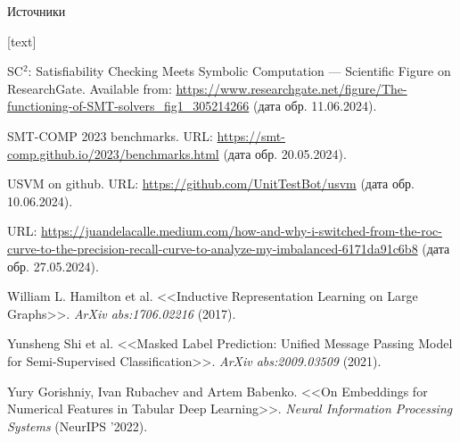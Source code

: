 \documentclass[14pt,aspectratio=169,hyperref={pdftex,unicode},xcolor=dvipsnames]{beamer}
\begin{document}
\begin{frame}{Источники}

\begin{thebibliography}{1}

[text]

 SC$^{\text{2}}$: Satisfiability Checking Meets Symbolic Computation --- Scientific Figure on ResearchGate. Available from: \url{https://www.researchgate.net/figure/The-functioning-of-SMT-solvers_fig1_305214266} (дата обр. 11.06.2024).

 SMT-COMP 2023 benchmarks. URL: \url{https://smt-comp.github.io/2023/benchmarks.html} (дата обр. 20.05.2024).

 USVM on github. URL: \url{https://github.com/UnitTestBot/usvm} (дата обр. 10.06.2024).

 URL: \url{https://juandelacalle.medium.com/how-and-why-i-switched-from-the-roc-curve-to-the-precision-recall-curve-to-analyze-my-imbalanced-6171da91c6b8} (дата обр. 27.05.2024).

 William L. Hamilton et al. <<Inductive Representation Learning on Large Graphs>>.  \textit{ArXiv abs:1706.02216} (2017).

 Yunsheng Shi et al. <<Masked Label Prediction: Unified Message Passing Model for Semi-Supervised Classification>>. \textit{ArXiv abs:2009.03509} (2021).

 Yury Gorishniy, Ivan Rubachev and Artem Babenko. <<On Embeddings for Numerical Features in Tabular Deep Learning>>. \textit{Neural Information Processing Systems} (NeurIPS '2022).

\end{thebibliography}

\end{frame}
\end{document}
